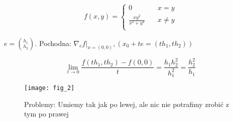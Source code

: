 \documentclass[../main.tex]{subfiles}
\begin{document}
\[ f(x,y) =
\begin{cases}
    0 & \quad x=y\\
    \frac{xy^2}{x^2+y^4} & \quad x \neq y\\
\end{cases}
\]

$e = \binom{h_1}{h_2}$. Pochodna: $\left. \nabla_e f\right |_{x=(0,0)}, (x_0 + te = (th_1, th_2))$

$$\lim\limits_{t \to 0}\frac{f(th_1, th_2) - f(0,0)}{t} = \frac{h_1 h_2^2}{h_1^2} = \frac{h_2^2}{h_1}$$

\begin{figure}
    \centering
    \texttt{[image: fig\_2]}
    \caption{Problemy: Umiemy tak jak po lewej, ale nic nie potrafimy zrobić z tym po prawej}
    \label{fig:fig_2}
\end{figure}
\end{document}
